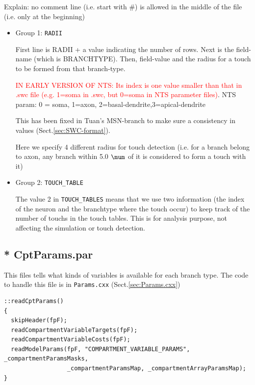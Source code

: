 Explain: no comment line (i.e. start with \#) is allowed in the middle of the
file (i.e. only at the beginning)
\begin{itemize}
  \item Group 1: \verb!RADII! 
  
  First line is RADII + a value indicating the number of rows. Next is the
  field-name (which is BRANCHTYPE).
  Then, field-value and the radius for a touch to be formed from that
  branch-type.
  
\begin{mdframed}
\textcolor{red}{IN EARLY VERSION OF NTS: Its index is one value smaller than
that in .swc file (e.g. 1=soma in .swc, but 0=soma in NTS parameter files)}.
NTS param: 0 = soma, 1=axon, 2=basal-dendrite,3=apical-dendrite


This has been fixed in Tuan's MSN-branch to make sure a consistency in values
(Sect.\ref{sec:SWC-format}).
\end{mdframed}
  
Here we specify 4 different radius for touch detection (i.e. for a branch belong
to axon, any branch within 5.0 $\mum$ of it is considered to form a touch with
it)

  \item Group 2: \verb!TOUCH_TABLE!
  
  
The value 2 in \verb!TOUCH_TABLES! means that we use two information (the index
of the neuron and the branchtype where the touch occur) to keep track of the
number of touchs in the touch tables. This is for analysis purpose, not
affecting the simulation or touch detection.
\end{itemize}






\subsection{* CptParams.par}
\label{sec:CptParams.par}

This files tells what kinds of variables is available for each branch type.
The code to handle this file is in \verb!Params.cxx! (Sect.\ref{sec:Params.cxx})
{\tiny
\begin{verbatim}
::readCptParams()
{
  skipHeader(fpF);
  readCompartmentVariableTargets(fpF);
  readCompartmentVariableCosts(fpF);
  readModelParams(fpF, "COMPARTMENT_VARIABLE_PARAMS", _compartmentParamsMasks,
                  _compartmentParamsMap, _compartmentArrayParamsMap);
}
\end{verbatim}
}

